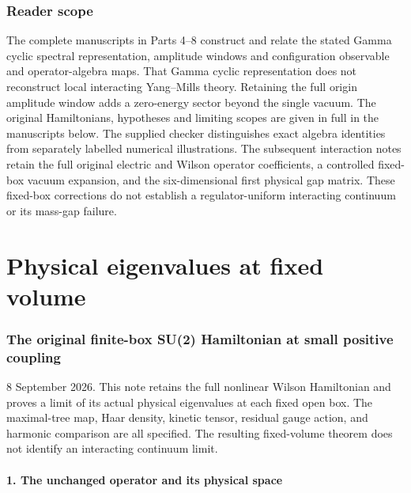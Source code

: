 \documentclass[
  11pt,
]{article}
\author{}
\date{}
\begin{document}
\section*{Reader scope}
The complete manuscripts in Parts 4--8 construct and relate the stated Gamma cyclic spectral representation, amplitude windows and configuration observable and operator-algebra maps. That Gamma cyclic representation does not reconstruct local interacting Yang--Mills theory. Retaining the full origin amplitude window adds a zero-energy sector beyond the single vacuum. The original Hamiltonians, hypotheses and limiting scopes are given in full in the manuscripts below. The supplied checker distinguishes exact algebra identities from separately labelled numerical illustrations. The subsequent interaction notes retain the full original electric and Wilson operator coefficients, a controlled fixed-box vacuum expansion, and the six-dimensional first physical gap matrix. These fixed-box corrections do not establish a regulator-uniform interacting continuum or its mass-gap failure.
\clearpage

\part{Physical eigenvalues at fixed volume}


\section{The original finite-box SU(2) Hamiltonian at small positive
coupling}\label{weak-coupling-part-1-the-original-finite-box-su2-hamiltonian-at-small-positive-coupling}

8 September 2026. This note retains the full nonlinear Wilson
Hamiltonian and proves a limit of its actual physical eigenvalues at
each fixed open box. The maximal-tree map, Haar density, kinetic tensor,
residual gauge action, and harmonic comparison are all specified. The
resulting fixed-volume theorem does not identify an interacting
continuum limit.

\subsection{1. The unchanged operator and its physical
space}\label{weak-coupling-part-1-the-unchanged-operator-and-its-physical-space}
\end{document}
